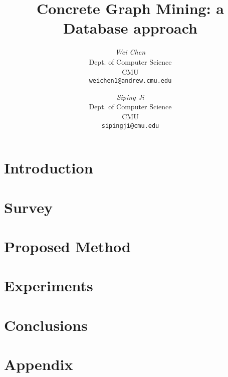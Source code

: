 \documentclass[12pt]{article}
\begin{document}
\newcommand{\beq}{\begin{equation}}
\newcommand{\eeq}{\end{equation}}
\newcommand{\bit}{\begin{itemize*}}
\newcommand{\eit}{\end{itemize*}}
\newcommand{\goal}[1]{ {\noindent {$\Rightarrow$} \em {#1} } }
\newcommand{\hide}[1]{}
\newcommand{\comment}[1]{ {\footnotesize {#1} } }
\newtheorem{lemma}{Lemma}
\newtheorem{theorem}{Theorem}
\newtheorem{proof}{Proof}
\newtheorem{defn}{Definition}
\newtheorem{algo}{Algorithm}
\newtheorem{observation}{Observation}

\title{Concrete Graph Mining: a Database approach}


\author{ {\em Wei Chen} \\
	    Dept. of Computer Science \\
	    CMU\\
	    {\tt weichen1@andrew.cmu.edu}
	 \and
	 {\em Siping Ji} \\
	     Dept. of Computer Science \\
	     CMU\\
	     {\tt sipingji@cmu.edu}
        }


\maketitle
\begin{abstract}
    
\end{abstract}

\section{Introduction}
    \label{sec:intro}
    

\section{Survey}
    \label{sec:survey}
    

\section{Proposed Method}
    \label{sec:proposed}
    


\section{Experiments}
    \label{sec:experiments}
    

\section{Conclusions}
    \label{sec:conclusions}
    





\newpage
\appendix
\section{Appendix}


\newpage
{}
\tableofcontents
\end{document}
